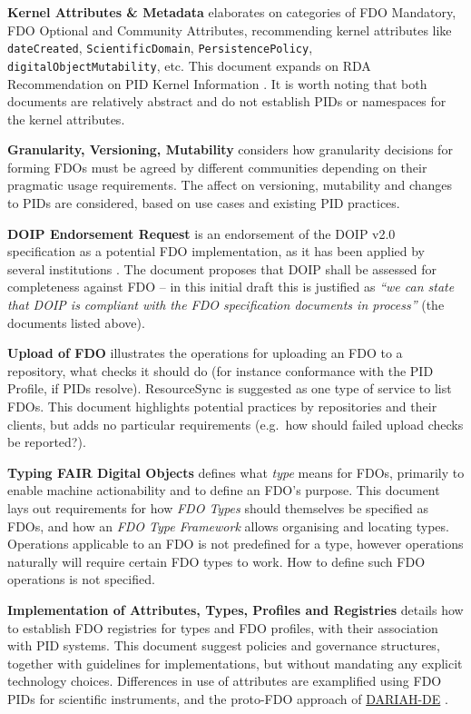\documentclass[fleqn,10pt,lineno]{wlpeerj}
\begin{document}
\textbf{Kernel Attributes \& Metadata} \cite{Fi62cJAo} elaborates on categories of FDO Mandatory, FDO Optional and Community Attributes, recommending kernel attributes like \texttt{dateCreated}, \texttt{ScientificDomain}, \texttt{PersistencePolicy}, \texttt{digitalObjectMutability}, etc. This document expands on RDA Recommendation on PID Kernel Information \cite{lCoshHXg}. It is worth noting that both documents are relatively abstract and do not establish PIDs or namespaces for the kernel attributes.

\textbf{Granularity, Versioning, Mutability} \cite{16W9AycSW} considers how granularity decisions for forming FDOs must be agreed by different communities depending on their pragmatic usage requirements. The affect on versioning, mutability and changes to PIDs are considered, based on use cases and existing PID practices.

\textbf{DOIP Endorsement Request} \cite{15yGpJ0wh} is an endorsement of the DOIP v2.0 \cite{13TcbsZF6} specification as a potential FDO implementation, as it has been applied by several institutions \cite{jRWurmQc}. The document proposes that DOIP shall be assessed for completeness against FDO -- in this initial draft this is justified as \emph{``we can state that DOIP is compliant with the FDO specification documents in process''} (the documents listed above).

\textbf{Upload of FDO} \cite{1H7cmmr69} illustrates the operations for uploading an FDO to a repository, what checks it should do (for instance conformance with the PID Profile, if PIDs resolve). ResourceSync \cite{eS5y9TRh} is suggested as one type of service to list FDOs. This document highlights potential practices by repositories and their clients, but adds no particular requirements (e.g.~how should failed upload checks be reported?).

\textbf{Typing FAIR Digital Objects} \cite{ZFzPxCNB} defines what \emph{type} means for FDOs, primarily to enable machine actionability and to define an FDO's purpose. This document lays out requirements for how \emph{FDO Types} should themselves be specified as FDOs, and how an \emph{FDO Type Framework} allows organising and locating types. Operations applicable to an FDO is not predefined for a type, however operations naturally will require certain FDO types to work. How to define such FDO operations is not specified.

\textbf{Implementation of Attributes, Types, Profiles and Registries} \cite{126uxr5pI} details how to establish FDO registries for types and FDO profiles, with their association with PID systems. This document suggest policies and governance structures, together with guidelines for implementations, but without mandating any explicit technology choices. Differences in use of attributes are examplified using FDO PIDs for scientific instruments, and the proto-FDO approach of \href{https://de.dariah.eu/}{DARIAH-DE} \cite{1CqIZ47pu}.
\end{document}
